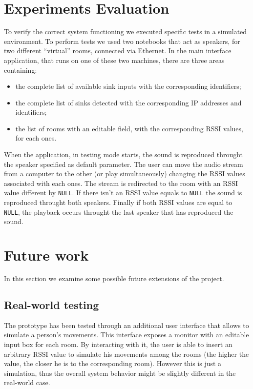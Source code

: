 \documentclass[conference]{IEEEtran}
\begin{document}
\section{Experiments Evaluation}
To verify the correct system functioning we executed specific tests in a simulated environment. To perform tests we used two notebooks that act as speakers, for two different ``virtual'' rooms, connected via Ethernet. In the main interface application, that runs on one of these two machines, there are three areas containing:
\begin{itemize}
	\item the complete list of available sink inputs with the corresponding identifiers;
	\item the complete list of sinks detected with the corresponding IP addresses and identifiers;
	\item the list of rooms with an editable field, with the corresponding RSSI values, for each ones.
	\end{itemize}

When the application, in testing mode starts, the sound is reproduced throught the speaker specified as default parameter. The user can move the audio stream from a computer to the other (or play simultaneously) changing the RSSI values associated with each ones. The stream is redirected to the room with an RSSI value different by \texttt{NULL}. If there isn't an RSSI value equals to \texttt{NULL} the sound is reproduced throught both speakers. Finally if both RSSI values are equal to \texttt{NULL}, the playback occurs throught the last speaker that has reproduced the sound.


\section{Future work}
In this section we examine some possible future extensions of the project.

\subsection{Real-world testing}
The prototype has been tested through an additional user interface that allows to simulate a person's movements. This interface exposes a monitor with an editable input box for each room. By interacting with it, the user is able to insert an arbitrary RSSI value to simulate his movements among the rooms (the higher the value, the closer he is to the corresponding room). However this is just a simulation, thus the overall system behavior might be slightly different in the real-world case.
\end{document}
